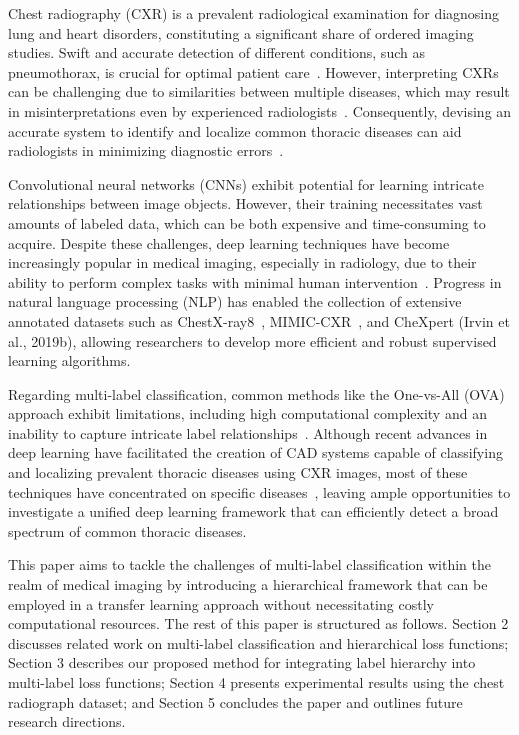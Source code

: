 Chest radiography (CXR) is a prevalent radiological examination for diagnosing lung and heart disorders, constituting a significant share of ordered imaging studies. Swift and accurate detection of different conditions, such as pneumothorax, is crucial for optimal patient care~\cite{bellaviti_Increased_2016}. However, interpreting CXRs can be challenging due to similarities between multiple diseases, which may result in misinterpretations even by experienced radiologists~\cite{delrue_Difficulties_2011}. Consequently, devising an accurate system to identify and localize common thoracic diseases can aid radiologists in minimizing diagnostic errors~\cite{crisp_Global_2014,silverstein_Most_2016}.

Convolutional neural networks (CNNs) exhibit potential for learning intricate relationships between image objects. However, their training necessitates vast amounts of labeled data, which can be both expensive and time-consuming to acquire. Despite these challenges, deep learning techniques have become increasingly popular in medical imaging, especially in radiology, due to their ability to perform complex tasks with minimal human intervention~\cite{jaderberg_Spatial_2015}. Progress in natural language processing (NLP) has enabled the collection of extensive annotated datasets such as ChestX-ray8~\cite{wang_ChestXRay8_2017}, MIMIC-CXR~\cite{johnson_MIMICCXR_2019}, and CheXpert (Irvin et al., 2019b), allowing researchers to develop more efficient and robust supervised learning algorithms.

Regarding multi-label classification, common methods like the One-vs-All (OVA) approach exhibit limitations, including high computational complexity and an inability to capture intricate label relationships~\cite{tsoumakas_MultiLabel_2007}. Although recent advances in deep learning have facilitated the creation of CAD systems capable of classifying and localizing prevalent thoracic diseases using CXR images, most of these techniques have concentrated on specific diseases~\cite{jaiswal_Identifying_2019,lakhani_Deep_2017,pasa_Efficient_2019,ausawalaithong_Automatic_2018}, leaving ample opportunities to investigate a unified deep learning framework that can efficiently detect a broad spectrum of common thoracic diseases.

This paper aims to tackle the challenges of multi-label classification within the realm of medical imaging by introducing a hierarchical framework that can be employed in a transfer learning approach without necessitating costly computational resources. The rest of this paper is structured as follows. Section 2 discusses related work on multi-label classification and hierarchical loss functions; Section 3 describes our proposed method for integrating label hierarchy into multi-label loss functions; Section 4 presents experimental results using the chest radiograph dataset; and Section 5 concludes the paper and outlines future research directions.
